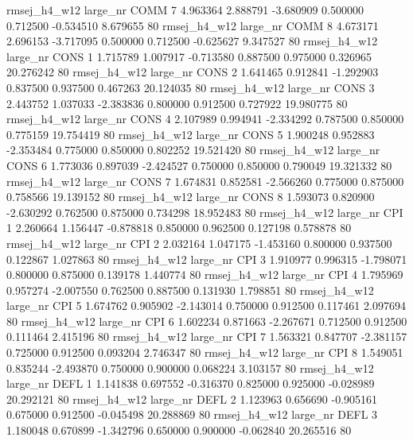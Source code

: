 rmsej_h4_w12   large_nr     COMM                 7  4.963364  2.888791  -3.680909 0.500000 0.712500 -0.534510    8.679655 80
rmsej_h4_w12   large_nr     COMM                 8  4.673171  2.696153  -3.717095 0.500000 0.712500 -0.625627    9.347527 80
rmsej_h4_w12   large_nr     CONS                 1  1.715789  1.007917  -0.713580 0.887500 0.975000  0.326965   20.276242 80
rmsej_h4_w12   large_nr     CONS                 2  1.641465  0.912841  -1.292903 0.837500 0.937500  0.467263   20.124035 80
rmsej_h4_w12   large_nr     CONS                 3  2.443752  1.037033  -2.383836 0.800000 0.912500  0.727922   19.980775 80
rmsej_h4_w12   large_nr     CONS                 4  2.107989  0.994941  -2.334292 0.787500 0.850000  0.775159   19.754419 80
rmsej_h4_w12   large_nr     CONS                 5  1.900248  0.952883  -2.353484 0.775000 0.850000  0.802252   19.521420 80
rmsej_h4_w12   large_nr     CONS                 6  1.773036  0.897039  -2.424527 0.750000 0.850000  0.790049   19.321332 80
rmsej_h4_w12   large_nr     CONS                 7  1.674831  0.852581  -2.566260 0.775000 0.875000  0.758566   19.139152 80
rmsej_h4_w12   large_nr     CONS                 8  1.593073  0.820900  -2.630292 0.762500 0.875000  0.734298   18.952483 80
rmsej_h4_w12   large_nr      CPI                 1  2.260664  1.156447  -0.878818 0.850000 0.962500  0.127198    0.578878 80
rmsej_h4_w12   large_nr      CPI                 2  2.032164  1.047175  -1.453160 0.800000 0.937500  0.122867    1.027863 80
rmsej_h4_w12   large_nr      CPI                 3  1.910977  0.996315  -1.798071 0.800000 0.875000  0.139178    1.440774 80
rmsej_h4_w12   large_nr      CPI                 4  1.795969  0.957274  -2.007550 0.762500 0.887500  0.131930    1.798851 80
rmsej_h4_w12   large_nr      CPI                 5  1.674762  0.905902  -2.143014 0.750000 0.912500  0.117461    2.097694 80
rmsej_h4_w12   large_nr      CPI                 6  1.602234  0.871663  -2.267671 0.712500 0.912500  0.111464    2.415196 80
rmsej_h4_w12   large_nr      CPI                 7  1.563321  0.847707  -2.381157 0.725000 0.912500  0.093204    2.746347 80
rmsej_h4_w12   large_nr      CPI                 8  1.549051  0.835244  -2.493870 0.750000 0.900000  0.068224    3.103157 80
rmsej_h4_w12   large_nr     DEFL                 1  1.141838  0.697552  -0.316370 0.825000 0.925000 -0.028989   20.292121 80
rmsej_h4_w12   large_nr     DEFL                 2  1.123963  0.656690  -0.905161 0.675000 0.912500 -0.045498   20.288869 80
rmsej_h4_w12   large_nr     DEFL                 3  1.180048  0.670899  -1.342796 0.650000 0.900000 -0.062840   20.265516 80
